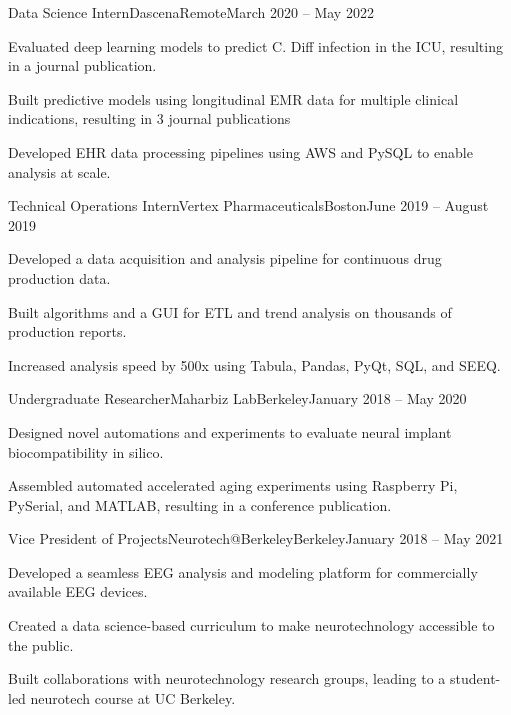 \begin{joblong}{Data Science Intern}{Dascena}{Remote}{March 2020 -- May 2022}
    \item Evaluated deep learning models to predict C. Diff infection in the ICU, resulting in a journal publication.
    \item Built predictive models using longitudinal EMR data for multiple clinical indications, resulting in 3 journal publications
    \item Developed EHR data processing pipelines using AWS and PySQL to enable analysis at scale.
\end{joblong}

\begin{joblong}{Technical Operations Intern}{Vertex Pharmaceuticals}{Boston}{June 2019 -- August 2019}
    \item Developed a data acquisition and analysis pipeline for continuous drug production data.
    \item Built algorithms and a GUI for ETL and trend analysis on thousands of production reports.
    \item Increased analysis speed by 500x using Tabula, Pandas, PyQt, SQL, and SEEQ.
\end{joblong}

\begin{joblong}{Undergraduate Researcher}{Maharbiz Lab}{Berkeley}{January 2018 -- May 2020}
    \item Designed novel automations and experiments to evaluate neural implant biocompatibility in silico.
    \item Assembled automated accelerated aging experiments using Raspberry Pi, PySerial, and MATLAB, resulting in a conference publication.
\end{joblong}

\begin{joblong}{Vice President of Projects}{Neurotech@Berkeley}{Berkeley}{January 2018 -- May 2021}
    \item Developed a seamless EEG analysis and modeling platform for commercially available EEG devices.
    \item Created a data science-based curriculum to make neurotechnology accessible to the public.
    \item Built collaborations with neurotechnology research groups, leading to a student-led neurotech course at UC Berkeley.
\end{joblong}
